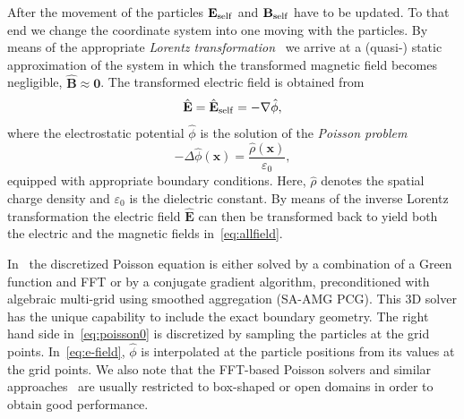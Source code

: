 \documentclass[acus]{JAC2003}
\begin{document}
After the movement of the particles 
$\mathbf{E_{\RM{self}}}$ and $\mathbf{B_{\RM{self}}}$ have to be updated.  
To that end we change the coordinate system into one moving with the
particles.  By means of the appropriate \emph{Lorentz
  transformation}~\cite{lali:84} we arrive at a (quasi-) static
approximation of the system in which the transformed magnetic field
becomes negligible, $\hat{\mathbf{B}}\! \approx\! \mathbf{0}$.  The
transformed electric field is obtained from
\begin{equation}\label{eq:e-field}
  \hat{\mathbf{E}}=\hat{\mathbf{E}}_{\RM{self}}=-\nabla\hat{\phi},
\end{equation}
where the electrostatic potential $\hat{\phi}$ is the solution of the
\emph{Poisson problem}
\begin{equation}\label{eq:poisson0}
  - \Delta \hat{\phi}(\mathbf{x}) =
  \frac{\hat{\rho}(\mathbf{x})}{\varepsilon_0},
\end{equation}
equipped with appropriate boundary conditions. Here, $\hat{\rho}$ denotes the spatial charge
density and $\varepsilon_0$ is the dielectric constant.
By means of the inverse Lorentz transformation the electric field
$\hat{\mathbf{E}}$ can then be transformed back to yield both the
electric and the magnetic fields in~\eqref{eq:allfield}.

In \opal\ the discretized Poisson equation is either solved by a combination of a Green function and FFT or by a conjugate gradient algorithm, preconditioned
with algebraic multi-grid using smoothed aggregation (SA-AMG PCG). This 3D solver has the unique capability to include the exact
boundary geometry. %
The right hand side in~\eqref{eq:poisson0} is discretized by sampling the particles at the
grid points.  In~\eqref{eq:e-field}, $\hat{\phi}$ is interpolated at the
particle positions from its values at the grid points. We also note that
the FFT-based Poisson solvers and similar
approaches~\cite{qiry:01,qigl:04} are usually restricted to box-shaped or open domains in order to obtain
good performance.
\end{document}
